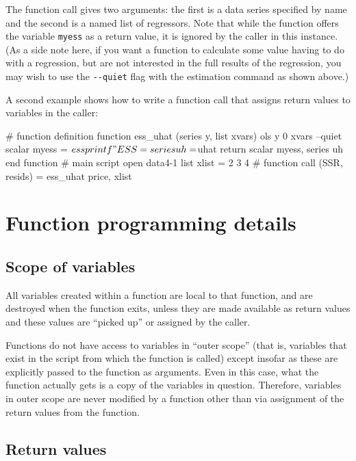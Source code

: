 The function call gives two arguments: the first is a data series
specified by name and the second is a named list of regressors.  Note
that while the function offers the variable \verb+myess+ as a return
value, it is ignored by the caller in this instance.  (As a side note
here, if you want a function to calculate some value having to do with
a regression, but are not interested in the full results of the
regression, you may wish to use the \verb+--quiet+ flag with the
estimation command as shown above.)
    
A second example shows how to write a function call that assigns
return values to variables in the caller:
    
\begin{code}
      # function definition
      function ess_uhat (series y, list xvars)
        ols y 0 xvars --quiet
        scalar myess = $ess
        printf "ESS = %
        series uh = $uhat
        return scalar myess, series uh
      end function
      # main script
      open data4-1
      list xlist = 2 3 4
      # function call
      (SSR, resids) = ess_uhat price, xlist
\end{code}

\section{Function programming details}
\label{func-details}

\subsection{Scope of variables}

All variables created within a function are local to that function,
and are destroyed when the function exits, unless they are made
available as return values and these values are ``picked up'' or
assigned by the caller.
    
Functions do not have access to variables in ``outer scope'' (that is,
variables that exist in the script from which the function is called)
except insofar as these are explicitly passed to the function as
arguments.  Even in this case, what the function actually gets is a
copy of the variables in question.  Therefore, variables in outer
scope are never modified by a function other than via assignment of
the return values from the function.
    

\subsection{Return values}

